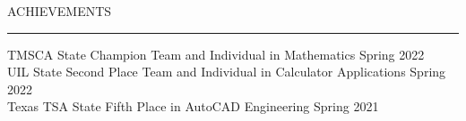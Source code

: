 \documentclass{resume} %
\renewenvironment{rSection}[1]{
\sectionskip
\textcolor{BurntOrange}{\MakeUppercase{#1}}
\sectionlineskip
\hrule
\begin{list}{}{
\setlength{\leftmargin}{0em}
}
\item[]
}{
\end{list}
}
\begin{document}


\begin{rSection}{Achievements} \itemsep -2pt
{TMSCA State Champion Team and Individual in Mathematics }\hfill { Spring 2022} \\
{UIL State Second Place Team and Individual in Calculator Applications }\hfill { Spring 2022} \\
{Texas TSA State Fifth Place in AutoCAD Engineering} \hfill { Spring 2021} 
\end{rSection}
\end{document}
